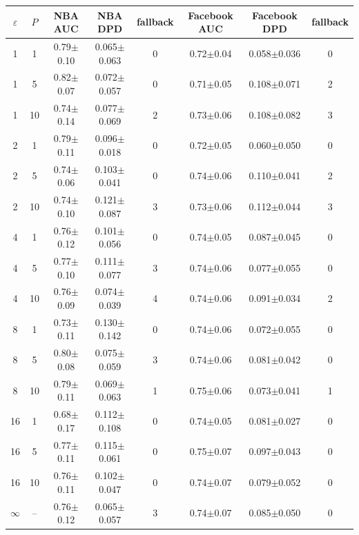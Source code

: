 \begin{table}[tbp]
\begin{tabular}{cccccccc}
\bottomrule
\end{tabular}
\vspace{4pt}
\begin{tabular}{cccccccc}
\toprule
$\varepsilon$ & $P$ & NBA AUC & NBA DPD & fallback & Facebook AUC & Facebook DPD & fallback \\
\midrule
1 & 1 & 0.79$\pm$0.10 & 0.065$\pm$0.063 & 0 & 0.72$\pm$0.04 & 0.058$\pm$0.036 & 0 \\
1 & 5 & 0.82$\pm$0.07 & 0.072$\pm$0.057 & 0 & 0.71$\pm$0.05 & 0.108$\pm$0.071 & 2 \\
1 & 10 & 0.74$\pm$0.14 & 0.077$\pm$0.069 & 2 & 0.73$\pm$0.06 & 0.108$\pm$0.082 & 3 \\
2 & 1 & 0.79$\pm$0.11 & 0.096$\pm$0.018 & 0 & 0.72$\pm$0.05 & 0.060$\pm$0.050 & 0 \\
2 & 5 & 0.74$\pm$0.06 & 0.103$\pm$0.041 & 0 & 0.74$\pm$0.06 & 0.110$\pm$0.041 & 2 \\
2 & 10 & 0.74$\pm$0.10 & 0.121$\pm$0.087 & 3 & 0.73$\pm$0.06 & 0.112$\pm$0.044 & 3 \\
4 & 1 & 0.76$\pm$0.12 & 0.101$\pm$0.056 & 0 & 0.74$\pm$0.05 & 0.087$\pm$0.045 & 0 \\
4 & 5 & 0.77$\pm$0.10 & 0.111$\pm$0.077 & 3 & 0.74$\pm$0.06 & 0.077$\pm$0.055 & 0 \\
4 & 10 & 0.76$\pm$0.09 & 0.074$\pm$0.039 & 4 & 0.74$\pm$0.06 & 0.091$\pm$0.034 & 2 \\
8 & 1 & 0.73$\pm$0.11 & 0.130$\pm$0.142 & 0 & 0.74$\pm$0.06 & 0.072$\pm$0.055 & 0 \\
8 & 5 & 0.80$\pm$0.08 & 0.075$\pm$0.059 & 3 & 0.74$\pm$0.06 & 0.081$\pm$0.042 & 0 \\
8 & 10 & 0.79$\pm$0.11 & 0.069$\pm$0.063 & 1 & 0.75$\pm$0.06 & 0.073$\pm$0.041 & 1 \\
16 & 1 & 0.68$\pm$0.17 & 0.112$\pm$0.108 & 0 & 0.74$\pm$0.05 & 0.081$\pm$0.027 & 0 \\
16 & 5 & 0.77$\pm$0.11 & 0.115$\pm$0.061 & 0 & 0.75$\pm$0.07 & 0.097$\pm$0.043 & 0 \\
16 & 10 & 0.76$\pm$0.11 & 0.102$\pm$0.047 & 0 & 0.74$\pm$0.07 & 0.079$\pm$0.052 & 0 \\
$\infty$ & -- & 0.76$\pm$0.12 & 0.065$\pm$0.057 & 3 & 0.74$\pm$0.07 & 0.085$\pm$0.050 & 0 \\
\bottomrule
\end{tabular}
\end{table}
